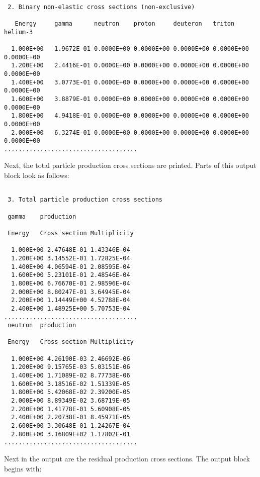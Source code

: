 \begin{samplecase}
{\small \begin{verbatim}

 2. Binary non-elastic cross sections (non-exclusive)
 
   Energy     gamma      neutron    proton     deuteron   triton     helium-3   
 
  1.000E+00   1.9672E-01 0.0000E+00 0.0000E+00 0.0000E+00 0.0000E+00 0.0000E+00 
  1.200E+00   2.4416E-01 0.0000E+00 0.0000E+00 0.0000E+00 0.0000E+00 0.0000E+00 
  1.400E+00   3.0773E-01 0.0000E+00 0.0000E+00 0.0000E+00 0.0000E+00 0.0000E+00 
  1.600E+00   3.8879E-01 0.0000E+00 0.0000E+00 0.0000E+00 0.0000E+00 0.0000E+00 
  1.800E+00   4.9418E-01 0.0000E+00 0.0000E+00 0.0000E+00 0.0000E+00 0.0000E+00 
  2.000E+00   6.3274E-01 0.0000E+00 0.0000E+00 0.0000E+00 0.0000E+00 0.0000E+00 
.....................................
\end{verbatim} } \renewcommand{\baselinestretch}{1.07}\small\normalsize
\noindent
Next, the total particle production cross sections are printed.
Parts of this output block look as follows:

{\small \begin{verbatim}

 3. Total particle production cross sections
 
 gamma    production     

 Energy   Cross section Multiplicity
  
  1.000E+00 2.47648E-01 1.43346E-04
  1.200E+00 3.14552E-01 1.72825E-04
  1.400E+00 4.06594E-01 2.08595E-04
  1.600E+00 5.23101E-01 2.48546E-04   
  1.800E+00 6.76670E-01 2.98596E-04
  2.000E+00 8.80247E-01 3.64945E-04
  2.200E+00 1.14449E+00 4.52788E-04
  2.400E+00 1.48925E+00 5.70753E-04      
.....................................
 neutron  production

 Energy   Cross section Multiplicity

  1.000E+00 4.26190E-03 2.46692E-06
  1.200E+00 9.15765E-03 5.03151E-06
  1.400E+00 1.71089E-02 8.77738E-06
  1.600E+00 3.18516E-02 1.51339E-05
  1.800E+00 5.42068E-02 2.39200E-05
  2.000E+00 8.89349E-02 3.68719E-05
  2.200E+00 1.41778E-01 5.60908E-05
  2.400E+00 2.20738E-01 8.45971E-05
  2.600E+00 3.30648E-01 1.24267E-04
  2.800E+00 3.16809E+02 1.17802E-01
.....................................
\end{verbatim} } \renewcommand{\baselinestretch}{1.07}\small\normalsize
\noindent
Next in the output are the residual production cross sections. The output
block begins with:

{\small \begin{verbatim}


\end{verbatim}}
\end{samplecase}
